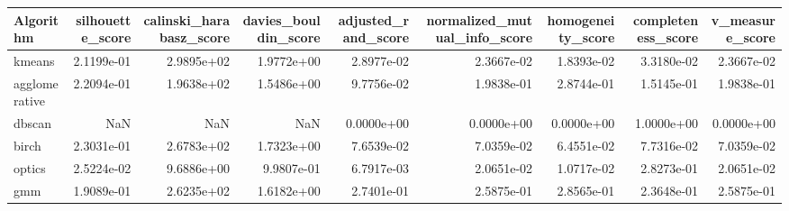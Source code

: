 \begin{tabular}{lrrrrrrrr}
\toprule
Algorithm & silhouette_score & calinski_harabasz_score & davies_bouldin_score & adjusted_rand_score & normalized_mutual_info_score & homogeneity_score & completeness_score & v_measure_score \\
\midrule
kmeans & 2.1199e-01 & 2.9895e+02 & 1.9772e+00 & 2.8977e-02 & 2.3667e-02 & 1.8393e-02 & 3.3180e-02 & 2.3667e-02 \\
agglomerative & 2.2094e-01 & 1.9638e+02 & 1.5486e+00 & 9.7756e-02 & 1.9838e-01 & 2.8744e-01 & 1.5145e-01 & 1.9838e-01 \\
dbscan & NaN & NaN & NaN & 0.0000e+00 & 0.0000e+00 & 0.0000e+00 & 1.0000e+00 & 0.0000e+00 \\
birch & 2.3031e-01 & 2.6783e+02 & 1.7323e+00 & 7.6539e-02 & 7.0359e-02 & 6.4551e-02 & 7.7316e-02 & 7.0359e-02 \\
optics & 2.5224e-02 & 9.6886e+00 & 9.9807e-01 & 6.7917e-03 & 2.0651e-02 & 1.0717e-02 & 2.8273e-01 & 2.0651e-02 \\
gmm & 1.9089e-01 & 2.6235e+02 & 1.6182e+00 & 2.7401e-01 & 2.5875e-01 & 2.8565e-01 & 2.3648e-01 & 2.5875e-01 \\
\bottomrule
\end{tabular}
